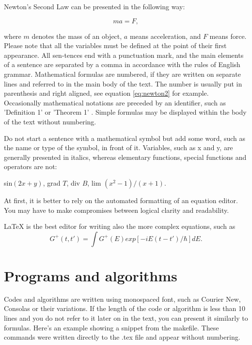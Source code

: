 \documentclass[12pt,a4paper,english
]{tunithesis}
\begin{document}
Newton's Second Law can be presented in the following way:

\begin{equation}
  \label{eq:newton2}
 ma= F,
\end{equation}

where $m$ denotes the mass of an object, $a$ means acceleration, and
$F$ means force. Please note that all the variables must be defined at
the point of their first appearance. All sen-tences end with a
punctuation mark, and the main elements of a sentence are separated by
a comma in accordance with the rules of English grammar.  Mathematical
formulas are numbered, if they are written on separate lines and
referred to in the main body of the text. The number is usually put in
parenthesis and right aligned, see equation \ref{eq:newton2} for
example. Occasionally mathematical notations are preceded by an
identifier, such as 'Definition 1' or 'Theorem 1'
\cite{ruohonen09}. Simple formulas may be displayed within the body of
the text without numbering.

Do not start a sentence with a mathematical symbol but add some word,
such as the name or type of the symbol, in front of it. Variables,
such as x and y, are generally presented in italics, whereas
elementary functions, special functions and operators are not:
\begin{center}
sin$(2x+y)$, 	grad $T$, 	div $B$, 	lim $(x^2 - 1)/(x + 1)$.
\end{center}

At first, it is better to rely on the automated formatting of an
equation editor. You may have to make compromises between logical
clarity and readability.


LaTeX is the best editor for writing also the more complex equations, such as
\begin{equation}
  \label{eq:fourier}
  G^+(t,t')= \int G^+(E) exp[-iE(t-t')/\hbar] dE.
\end{equation}




\section{Programs and algorithms}

Codes and algorithms are written using monospaced font, such as
Courier New, Consolas or their variations. If the length of the code
or algorithm is less than 10 lines and you do not refer to it later on
in the text, you can present it similarly to formulas.  Here's an
example showing a snippet from the makefile. These commands were
written directly to the .tex file and appear without numbering.
\end{document}
